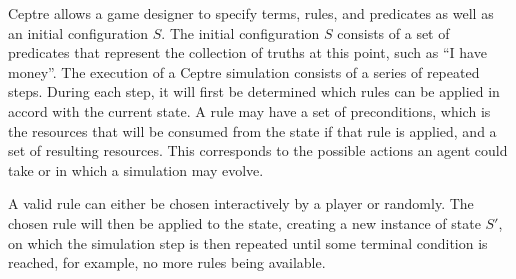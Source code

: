 Ceptre allows a game designer to specify terms, rules, and predicates as well as an initial configuration $S$.
The initial configuration $S$ consists of a set of predicates that represent the collection of truths at this point, such as \enquote{I have money}.
The execution of a Ceptre simulation consists of a series of repeated steps.
During each step, it will first be determined which rules can be applied in accord with the current state.
A rule may have a set of preconditions, which is the resources that will be consumed from the state if that rule is applied, and a set of resulting resources.
This corresponds to the possible actions an agent could take or in which a simulation may evolve.

A valid rule can either be chosen interactively by a player or randomly.
The chosen rule will then be applied to the state, creating a new instance of state $S'$, on which the simulation step is then repeated until some terminal condition is reached, for example, no more rules being available.